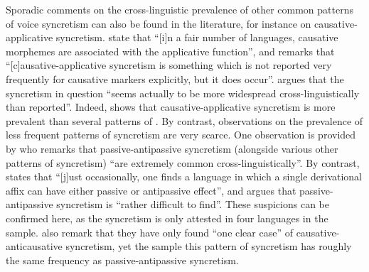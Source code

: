 Sporadic comments on the cross-linguistic prevalence of other common patterns of voice syncretism can also be found in the literature, for instance on causative-applicative syncretism. \cite[116]{shibatani:pardeshi:2002} state that “[i]n a fair number of languages, causative morphemes are associated with the applicative function”, and \cite[182]{peterson:2007} remarks that “[c]ausative-applicative syncretism is something which is not reported very frequently for causative markers explicitly, but it does occur”. \cite[10]{malchukov:2017} argues that the syncretism in question “seems actually to be more widespread cross-linguistically than reported”. Indeed,  shows that causative-applicative syncretism is more prevalent than several patterns of . By contrast, observations on the prevalence of less frequent patterns of syncretism are very scarce. One observation is provided by \cite[10]{creissels:2012} who remarks that passive-antipassive syncretism (alongside various other patterns of syncretism) “are extremely common cross-linguistically”. By contrast, \cite[151]{dixon:1994} states that “[j]ust occasionally, one finds a language in which a single derivational affix can have either passive or antipassive effect”, and \cite[241]{zuniga:kittila:2019} argues that passive-antipassive syncretism is “rather difficult to find”. These suspicions can be confirmed here, as the syncretism is only attested in four languages in the sample. \cite[244]{zuniga:kittila:2019} also remark that they have only found “one clear case” of causative-anticausative syncretism, yet the sample this pattern of syncretism has roughly the same frequency as passive-antipassive syncretism. 

